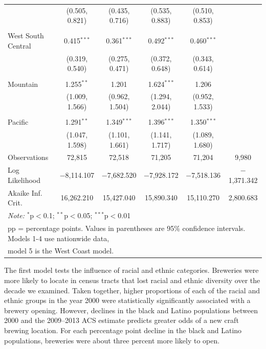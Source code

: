 \documentclass[]{article}
\begin{document}
\begin{landscape}
\begin{longtable}[c]{@{}lccccc@{}}
  & (0.505, 0.821) & (0.435, 0.716) & (0.535, 0.883) & (0.510, 0.853) &  \\ 
  & & & & & \\ 
 West South Central & 0.415$^{***}$ & 0.361$^{***}$ & 0.492$^{***}$ & 0.460$^{***}$ &  \\ 
  & (0.319, 0.540) & (0.275, 0.471) & (0.372, 0.648) & (0.343, 0.614) &  \\ 
  & & & & & \\ 
 Mountain & 1.255$^{**}$ & 1.201 & 1.624$^{***}$ & 1.206 &  \\ 
  & (1.009, 1.566) & (0.962, 1.504) & (1.294, 2.044) & (0.952, 1.533) &  \\ 
  & & & & & \\ 
 Pacific & 1.291$^{**}$ & 1.349$^{***}$ & 1.396$^{***}$ & 1.350$^{***}$ &  \\ 
  & (1.047, 1.598) & (1.101, 1.661) & (1.141, 1.717) & (1.089, 1.680) &  \\ 
\midrule
Observations & 72,815 & 72,518 & 71,205 & 71,204 & 9,980 \\ 
Log Likelihood & $-$8,114.107 & $-$7,682.520 & $-$7,928.172 & $-$7,518.136 & $-$1,371.342 \\ 
Akaike Inf. Crit. & 16,262.210 & 15,427.040 & 15,890.340 & 15,110.270 & 2,800.683 \\ 
\bottomrule
\multicolumn{6}{l}{\textit{Note:} $^{*}$p$<$0.1; $^{**}$p$<$0.05; $^{***}$p$<$0.01} \\ 
\multicolumn{6}{l}{pp = percentage points. Values in parentheses are 95\% confidence intervals. Models 1-4 use nationwide data, } \\
\multicolumn{6}{l}{model 5 is the West Coast model.}
\end{longtable}
\end{landscape}

The first model tests the influence of racial and ethnic categories.
Breweries were more likely to locate in census tracts that lost racial
and ethnic diversity over the decade we examined. Taken together, higher
proportions of each of the racial and ethnic groups in the year 2000
were statistically significantly associated with a brewery opening.
However, declines in the black and Latino populations between 2000 and
the 2009--2013 ACS estimate predicts greater odds of a new craft brewing
location. For each percentage point decline in the black and Latino
populations, breweries were about three percent more likely to open.
\end{document}
